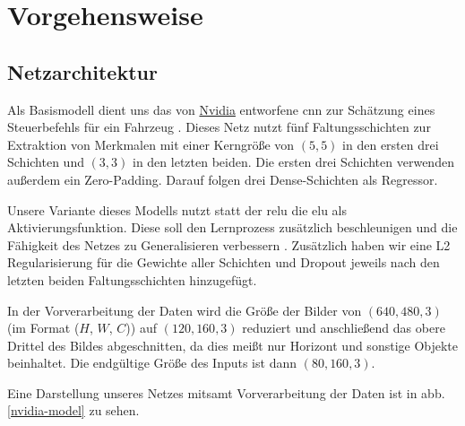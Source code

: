 
\chapter{Vorgehensweise}

\section{Netzarchitektur}

Als Basismodell dient uns das von \href{https://www.nvidia.com/en-us/}{Nvidia} entworfene \acs{cnn} zur Schätzung eines Steuerbefehls für ein Fahrzeug \cite{nvidia}. Dieses Netz nutzt fünf Faltungsschichten zur Extraktion von Merkmalen mit einer Kerngröße von $(5, 5)$ in den ersten drei Schichten und $(3, 3)$ in den letzten beiden. Die ersten drei Schichten verwenden außerdem ein Zero-Padding. Darauf folgen drei Dense-Schichten als Regressor.

Unsere Variante dieses Modells nutzt statt der \acs{relu} die \acs{elu} als Aktivierungsfunktion. Diese soll den Lernprozess zusätzlich beschleunigen und die Fähigkeit des Netzes zu Generalisieren verbessern \cite{elu}. Zusätzlich haben wir eine L2 Regularisierung für die Gewichte aller Schichten und Dropout jeweils nach den letzten beiden Faltungsschichten hinzugefügt.

In der Vorverarbeitung der Daten wird die Größe der Bilder von $(640, 480, 3)$ (im Format ($H$, $W$, $C$)) auf $(120, 160, 3)$ reduziert und anschließend das obere Drittel des Bildes abgeschnitten, da dies meißt nur Horizont und sonstige Objekte beinhaltet. Die endgültige Größe des Inputs ist dann $(80, 160, 3)$.

Eine Darstellung unseres Netzes mitsamt Vorverarbeitung der Daten ist in \acs{abb.} \ref{nvidia-model} zu sehen.

